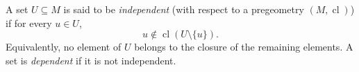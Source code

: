 A set $U \subseteq M$ is said to be \emph{independent} (with respect to a pregeometry $(M, \operatorname{cl})$) if for every $u \in U$,
$$u \notin \operatorname{cl}(U \setminus \{u\}).$$
Equivalently, no element of $U$ belongs to the closure of the remaining elements. A set is \emph{dependent} if it is not independent.

